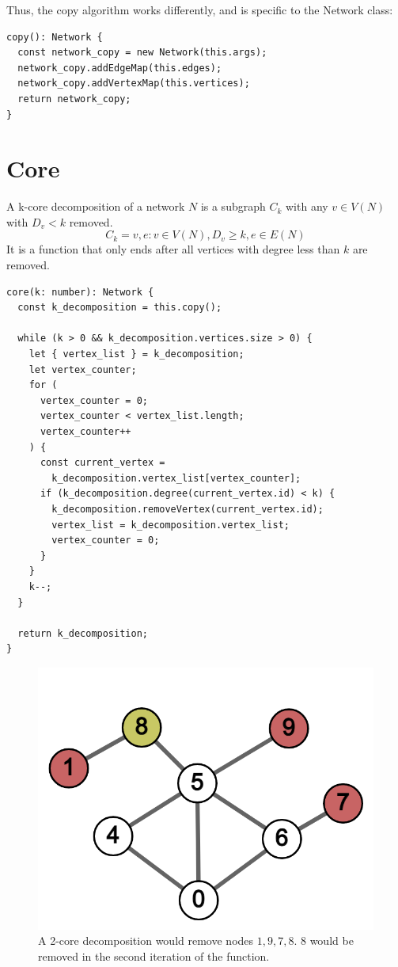 Thus, the copy algorithm works differently, and is specific to the Network class:

\begin{verbatim}
copy(): Network {
  const network_copy = new Network(this.args);
  network_copy.addEdgeMap(this.edges);
  network_copy.addVertexMap(this.vertices);
  return network_copy;
}
\end{verbatim}

\section{Core}

A k-core decomposition of a network $N$ is a subgraph $C_k$ with any
$v\in V(N)$ with $D_v<k$ removed.
$$C_k={v,e:v\in V(N), D_v\geq k,e\in E(N)}$$
It is a function that only ends after all vertices with degree less than $k$ are removed.

\begin{verbatim}
core(k: number): Network {
  const k_decomposition = this.copy();

  while (k > 0 && k_decomposition.vertices.size > 0) {
    let { vertex_list } = k_decomposition;
    let vertex_counter;
    for (
      vertex_counter = 0;
      vertex_counter < vertex_list.length;
      vertex_counter++
    ) {
      const current_vertex =
        k_decomposition.vertex_list[vertex_counter];
      if (k_decomposition.degree(current_vertex.id) < k) {
        k_decomposition.removeVertex(current_vertex.id);
        vertex_list = k_decomposition.vertex_list;
        vertex_counter = 0;
      }
    }
    k--;
  }

  return k_decomposition;
}
\end{verbatim}

\begin{figure}[H]
  \centering
  \includegraphics[scale=.25]{img/core_ex.png}
  \caption{A 2-core decomposition would remove nodes $1,9,7,8$. $8$ would be removed in the second iteration of the function.}
  \label{fig:core_ex}
\end{figure}


